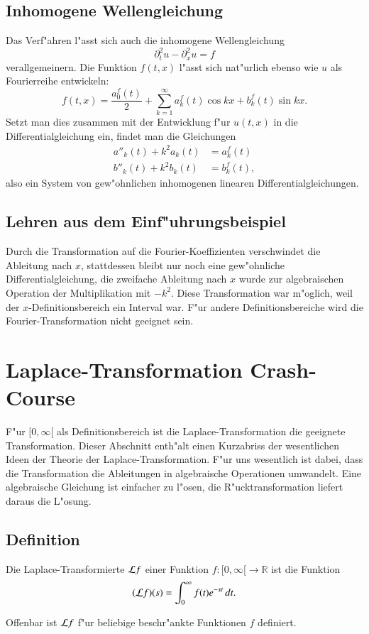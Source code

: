\subsection{Inhomogene Wellengleichung}
Das Verf"ahren l"asst sich auch die inhomogene Wellengleichung
$$
\partial_t^2u-\partial_x^2u=f
$$
verallgemeinern. Die Funktion $f(t,x)$ l"asst sich nat"urlich ebenso wie
$u$ als Fourierreihe entwickeln:
$$
f(t,x)=\frac{a_0^f(t)}2+\sum_{k=1}^\infty a_k^f(t)\cos kx+b_k^f(t)\sin kx.
$$
Setzt man dies zusammen mit der Entwicklung f"ur $u(t,x)$ in die
Differentialgleichung ein, findet man die Gleichungen
\begin{align*}
a''_k(t)+k^2a_k(t)&=a_k^f(t)\\
b''_k(t)+k^2b_k(t)&=b_k^f(t),
\end{align*}
also ein System von gew"ohnlichen inhomogenen linearen Differentialgleichungen.

\subsection{Lehren aus dem Einf"uhrungsbeispiel}
Durch die Transformation auf die Fourier-Koeffizienten verschwindet die
Ableitung nach $x$,  stattdessen bleibt nur noch eine gew"ohnliche
Differentialgleichung, die zweifache Ableitung nach $x$ wurde zur
algebraischen Operation der Multiplikation mit $-k^2$. Diese Transformation
war m"oglich, weil der $x$-Definitionsbereich ein Interval war.
F"ur andere Definitionsbereiche wird die Fourier-Transformation nicht
geeignet sein.

\section{Laplace-Transformation Crash-Course}
F"ur $[0,\infty[$ als Definitionsbereich ist die Laplace-Transformation
die geeignete Transformation. Dieser Abschnitt enth"alt einen Kurzabriss
der wesentlichen Ideen der Theorie der Laplace-Transformation.
F"ur uns wesentlich ist dabei, dass die Transformation die Ableitungen
in algebraische Operationen umwandelt. Eine algebraische Gleichung ist
einfacher zu l"osen, die R"ucktransformation liefert daraus die L"osung.

\subsection{Definition}
\begin{definition}
Die Laplace-Transformierte ${\cal L}f$ einer Funktion
$f\colon[0,\infty[\to\mathbb R$ ist die Funktion
$$
({\cal L}f)(s)=\int_0^\infty f(t)e^{-st}\,dt.
$$
\end{definition}
Offenbar ist ${\cal L}f$ f"ur beliebige beschr"ankte Funktionen $f$ definiert.

